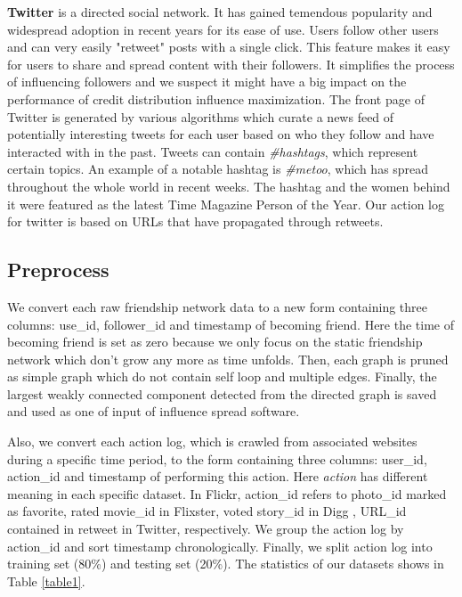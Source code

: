 \documentclass{acm_proc_article-sp}
\begin{document}
\textbf{Twitter} \cite{data:twitter} is a directed social network. It has gained temendous popularity and widespread adoption in recent years for its ease of use. Users follow other users and can very easily "retweet" posts with a single click. This feature makes it easy for users to share and spread content with their followers. It simplifies the process of influencing followers and we suspect it might have a big impact on the performance of credit distribution influence maximization. The front page of Twitter is generated by various algorithms which curate a news feed of potentially interesting tweets for each user based on who they follow and have interacted with in the past. Tweets can contain \textit{\#hashtags}, which represent certain topics. An example of a notable hashtag is \textit{\#metoo}, which has spread throughout the whole world in recent weeks. The hashtag and the women behind it were featured as the latest Time Magazine Person of the Year. Our action log for twitter is based on URLs that have propagated through retweets.
 \cite{DBLP:journals/corr/abs-1202-3162}

\subsection*{Preprocess}
We convert each raw friendship network data to a new form containing three columns: use\_id, follower\_id and timestamp of becoming friend. Here the time of becoming friend is set as zero because we only focus on the static friendship network which don't grow any more as time unfolds. Then, each graph is pruned as simple graph which do not contain self loop and multiple edges. Finally, the largest weakly connected component detected from the directed graph is saved and used as one of input of influence spread software.

Also, we convert each action log, which is crawled from associated websites during a specific time period, to the form containing three columns: user\_id, action\_id and timestamp of performing this action. Here \textit{action} has different meaning in each specific dataset. In Flickr, action\_id refers to photo\_id marked as favorite, rated movie\_id in Flixster, voted story\_id in Digg , URL\_id contained in retweet in Twitter, respectively. We group the action log by action\_id and sort timestamp chronologically. Finally, we split action log into training set (80\%) and testing set (20\%). The statistics of our datasets shows in Table \ref{table1}.
\end{document}
